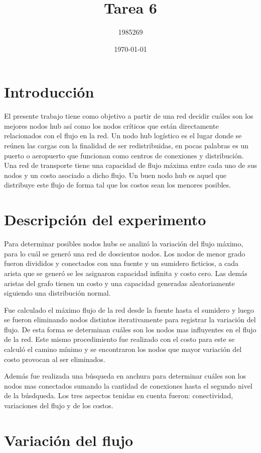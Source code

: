 \documentclass[a4paper, 11pt]{article}
\title{Tarea 6}
\date{\today}
\author{1985269}
\begin{document}
\maketitle

\section{Introducci\'on}
El presente trabajo tiene como objetivo a partir de una red decidir cu\'ales son los mejores nodos hub as\'i como los nodos cr\'iticos que est\'an directamente relacionados con el flujo en la red. Un nodo hub logístico es el lugar donde se reúnen las cargas con la finalidad de ser redistribuidas, en pocas palabras es un puerto o aeropuerto que funcionan como centros de conexiones y distribución. Una red de transporte tiene una capacidad de flujo m\'axima entre cada uno de sus nodos y un costo asociado a dicho flujo. Un buen nodo hub es aquel que distribuye este flujo de forma tal que los costos sean los menores posibles.


\section{Descripci\'on del experimento}
Para determinar posibles nodos hubs se analiz\'o la variaci\'on del flujo m\'aximo, para lo cu\'al se gener\'o una red de doscientos nodos. Los nodos de menor grado fueron divididos y conectados con una fuente y un sumidero ficticios, a cada arista que se gener\'o se les asignaron capacidad infinita y costo cero. Las dem\'as aristas del grafo tienen un costo y una capacidad generadas aleatoriamente siguiendo una distribuci\'on normal.

Fue calculado el m\'aximo flujo de la red desde la fuente hasta el sumidero y luego se fueron eliminando nodos distintos iterativamente para registrar la variaci\'on del flujo. De esta forma se determinan cu\'ales son los nodos mas influyentes en el flujo de la red. Este mismo procedimiento fue realizado con el costo para este se calcul\'o el camino m\'inimo y se encontraron los nodos que mayor variaci\'on del costo provocan al ser eliminados.

Adem\'as fue realizada una b\'usqueda en anchura para determinar cu\'ales son los nodos mas conectados sumando la cantidad de conexiones hasta el segundo nivel de la b\'usdqueda. Los tres aspectos tenidas en cuenta fueron: conectividad, variaciones del flujo y de los costos. 



\section{Variaci\'on del flujo}
\end{document}

